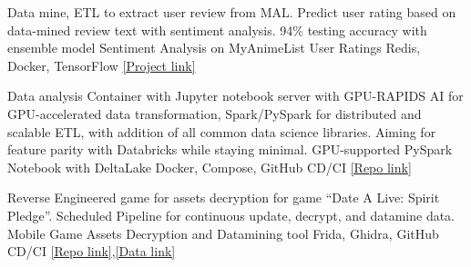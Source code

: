 \begin{cventries}



	\cventry
	{Data mine, ETL to extract user review from MAL. Predict user rating based on data-mined review text with sentiment analysis. 94\% testing accuracy with ensemble model}
	{Sentiment Analysis on MyAnimeList User Ratings}
	{Redis, Docker, TensorFlow}
	{\href{https://github.com/n0k0m3/rnn-mal-sentiment}{[Project link]}}
	{}
	\vspace{-6mm}

	\cventry
	{Data analysis Container with Jupyter notebook server with GPU-RAPIDS AI for GPU-accelerated data transformation, Spark/PySpark for distributed and scalable ETL, with addition of all common data science libraries. Aiming for feature parity with Databricks while staying minimal.}
	{GPU-supported PySpark Notebook with DeltaLake}
	{Docker, Compose, GitHub CD/CI}
	{\href{https://github.com/n0k0m3/pyspark-notebook-deltalake-docker}{[Repo link]}}
	{}
	\vspace{-6mm}

	\cventry
	{Reverse Engineered game for assets decryption for game ``Date A Live: Spirit Pledge''. Scheduled Pipeline for continuous update, decrypt, and datamine data.}
	{Mobile Game Assets Decryption and Datamining tool}
	{Frida, Ghidra, GitHub CD/CI}
	{\href{https://github.com/n0k0m3/DALSP-Assets-Decryption-tool}{[Repo link]},\href{https://github.com/n0k0m3/DateALiveData}{[Data link]}}
	{}
	\vspace{-10mm}

\end{cventries}
